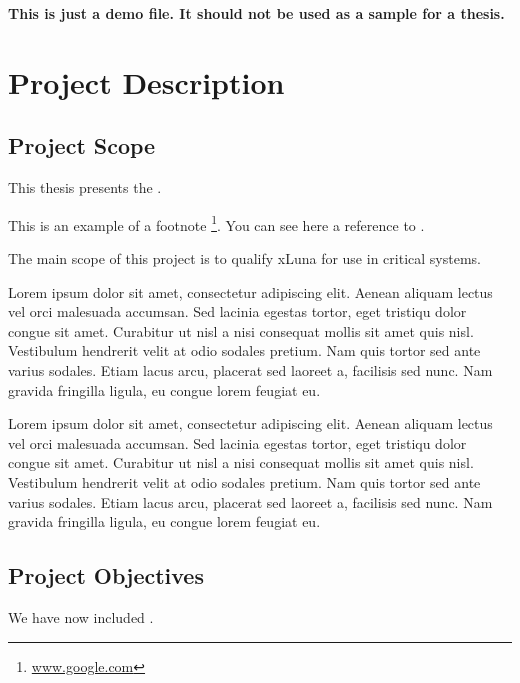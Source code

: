 
\textbf{This is just a demo file. It should not be used as a sample for a thesis.}\\

\section{Project Description}
\label{sec:proj}

\subsection{Project Scope}
\label{sub-sec:proj-scope}

This thesis presents the \textbf{\project}.

This is an example of a footnote \footnote{\url{www.google.com}}. You can see here a reference to .


The main scope of this project is to qualify xLuna for use in critical systems.


Lorem ipsum dolor sit amet,\cite{grishman1996} consectetur adipiscing elit. Aenean aliquam lectus vel orci malesuada accumsan. Sed lacinia egestas tortor, eget tristiqu dolor congue sit amet. Curabitur ut nisl a nisi consequat mollis sit amet quis nisl. Vestibulum hendrerit velit at odio sodales pretium. Nam quis tortor sed ante varius sodales. Etiam lacus arcu, placerat sed laoreet a, facilisis sed nunc. Nam gravida fringilla ligula, eu congue lorem feugiat eu.

Lorem ipsum dolor sit amet, consectetur adipiscing elit. Aenean aliquam lectus vel orci malesuada accumsan. Sed lacinia egestas tortor, eget tristiqu dolor congue sit amet. Curabitur ut nisl a nisi consequat mollis sit amet quis nisl. Vestibulum hendrerit velit at odio sodales pretium. Nam quis tortor sed ante varius sodales. Etiam lacus arcu, placerat sed laoreet a, facilisis sed nunc. Nam gravida fringilla ligula, eu congue lorem feugiat eu.


\subsection{Project Objectives}
\label{sub-sec:proj-objectives}

We have now included .



